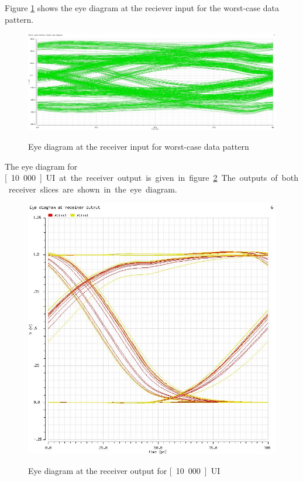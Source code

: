 Figure \ref{fig:rx_inp_wc_eye} shows the eye diagram at the reciever input for the worst-case data pattern.

\begin{figure}[H]
  \centering
  {\includegraphics[scale=0.33]{img/wc_ch_eye.jpg}}
  \caption{Eye diagram at the receiver input for worst-case data pattern}
  \label{fig:rx_inp_wc_eye}
\end{figure}


The eye diagram for \unit[10.000]{UI} at the receiver output is given in figure \ref{fig:rx_out_eye}. The outputs of both receiver slices are shown in the eye diagram.

\begin{figure}[H]
  \centering
  {\includegraphics[scale=0.8]{img/rx_out_eye.jpg}}
  \caption{Eye diagram at the receiver output for \unit[10.000]{UI}}
  \label{fig:rx_out_eye}
\end{figure}